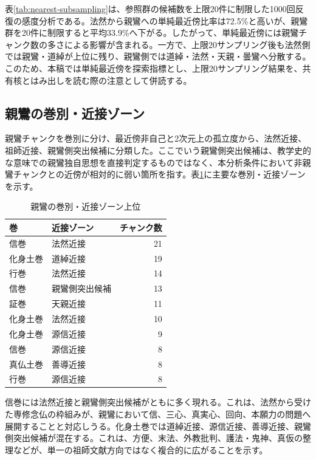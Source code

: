 \documentclass[uplatex,dvipdfmx,11pt,a4paper]{jsarticle}
\begin{document}
表\ref{tab:nearest-subsampling}は、参照群の候補数を上限20件に制限した1000回反復の感度分析である。法然から親鸞への単純最近傍比率は72.5\%と高いが、親鸞群を20件に制限すると平均33.9\%へ下がる。したがって、単純最近傍には親鸞チャンク数の多さによる影響が含まれる。一方で、上限20サンプリング後も法然側では親鸞・道綽が上位に残り、親鸞側では道綽・法然・天親・曇鸞へ分散する。このため、本稿では単純最近傍を探索指標とし、上限20サンプリング結果を、共有核とはみ出しを読む際の注意として併読する。

\subsection{親鸞の巻別・近接ゾーン}

親鸞チャンクを巻別に分け、最近傍非自己と2次元上の孤立度から、法然近接、祖師近接、親鸞側突出候補に分類した。ここでいう親鸞側突出候補は、教学史的な意味での親鸞独自思想を直接判定するものではなく、本分析条件において非親鸞チャンクとの近傍が相対的に弱い箇所を指す。表\ref{tab:shinran-volume-affinity}に主要な巻別・近接ゾーンを示す。

\begin{table}[H]
\centering
\small
\caption{親鸞の巻別・近接ゾーン上位}
\label{tab:shinran-volume-affinity}
\begin{tabular}{@{}llr@{}}
\toprule
巻 & 近接ゾーン & チャンク数 \\
\midrule
信巻 & 法然近接 & 21 \\
化身土巻 & 道綽近接 & 19 \\
行巻 & 法然近接 & 14 \\
信巻 & 親鸞側突出候補 & 13 \\
証巻 & 天親近接 & 11 \\
化身土巻 & 法然近接 & 10 \\
化身土巻 & 源信近接 & 9 \\
信巻 & 源信近接 & 8 \\
真仏土巻 & 善導近接 & 8 \\
行巻 & 源信近接 & 8 \\
\bottomrule
\end{tabular}
\end{table}

信巻には法然近接と親鸞側突出候補がともに多く現れる。これは、法然から受けた専修念仏の枠組みが、親鸞において信、三心、真実心、回向、本願力の問題へ展開することと対応しうる。化身土巻では道綽近接、源信近接、善導近接、親鸞側突出候補が混在する。これは、方便、末法、外教批判、護法・鬼神、真仮の整理などが、単一の祖師文献方向ではなく複合的に広がることを示す。
\end{document}
